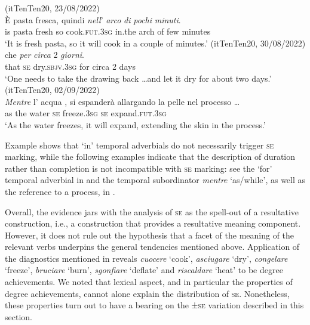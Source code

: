 \documentclass[output=paper,colorlinks,citecolor=brown
]{langscibook}
\begin{document}
\ea \label{bentley_example_26}(itTenTen20, 23/08/2022)\\
    \gll È	pasta	fresca,	quindi  					\textit{nell}’			\textit{arco}		\textit{di}	 	\textit{pochi} \textit{minuti}. \\
    		is	pasta	fresh		so					cook.\textsc{fut}.3\textsc{sg}	in.the		arch		of		few		minutes \\
    \glt ‘It is fresh pasta, so it will cook in a couple of minutes.’
\ex \label{bentley_example_27}(itTenTen20, 30/08/2022)\\
      che									\textit{per}		\textit{circa}	2	\textit{giorni}. \\
    	{} 		that	\textsc{se}		dry.\textsc{sbjv}.3\textsc{sg}		for		circa	2	days \\
    \glt	‘One needs to take the drawing back \ldots  and let it dry for about two days.’
\ex \label{bentley_example_28}(itTenTen20, 02/09/2022)\\
    \gll \textit{Mentre}	l’		acqua		
    ,			si		espanderà {	allargando la pelle
      nel processo \ldots}\\
    	as						the	water		\textsc{se}		freeze.3\textsc{sg}		\textsc{se}		expand.\textsc{fut}.3\textsc{sg} {} \\
    \glt 	‘As the water freezes, it will expand, extending the skin in the process.’
\z

Example  shows that ‘in’ temporal adverbials do not necessarily trigger \textsc{se} marking, while the following examples indicate that the description of duration rather than completion is not incompatible with \textsc{se} marking: see the ‘for’ temporal adverbial in  and the temporal subordinator \textit{mentre} ‘as/while’, as well as the reference to a process, in . 

Overall, the evidence jars with the analysis of \textsc{se} as the spell-out of a resultative construction, i.e., a construction that provides a resultative meaning component. However, it does not rule out the hypothesis that a facet of the meaning of the relevant verbs underpins the general tendencies mentioned above. Application of the diagnostics mentioned in  reveals \textit{cuocere} ‘cook’, \textit{asciugare} ‘dry’, \textit{congelare} ‘freeze’, \textit{bruciare} ‘burn’, \textit{sgonfiare} ‘deflate’ and \textit{riscaldare} ‘heat’ to be degree achievements. We noted that lexical aspect, and in particular the properties of degree achievements, cannot alone explain the distribution of \textsc{se}. Nonetheless, these properties turn out to have a bearing on the ±\textsc{se} variation described in this section. 
\end{document}
